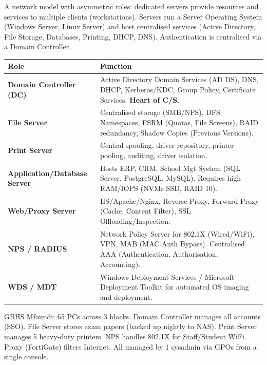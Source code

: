 \documentclass[11pt]{article}
\newcommand{\cle}[1]{{\popxbold\color{popdark}#1}}
\newcounter{popsec}
\newcounter{popsub}
\newcommand{\courssub}[1]{%
  \stepcounter{popsub}%
  \par\vspace{9pt}\noindent{\popxbold\fontsize{11.5}{13}\selectfont\color{popink}{\color{poporange}\thepopsec.\thepopsub}\hspace{6pt}#1}\par\nopagebreak\vspace{4pt}
}
\begin{document}
\courssub{Client/Server Architecture}

\begin{definition}
A network model with \cle{asymmetric roles}: dedicated \cle{servers} provide resources and services to multiple \cle{clients} (workstations). Servers run a \cle{Server Operating System} (Windows Server, Linux Server) and host centralised services (Active Directory, File Storage, Databases, Printing, DHCP, DNS). Authentication is centralised via a \cle{Domain Controller}.
\end{definition}

\begin{propriete}
\begin{center}
\begin{tabularx}{\linewidth}{|l|X|}
\hline
\rowcolor{popblueL}
\textbf{Role} & \textbf{Function} \\
\hline
\textbf{Domain Controller (DC)} & Active Directory Domain Services (AD DS), DNS, DHCP, Kerberos/KDC, Group Policy, Certificate Services. \textbf{Heart of C/S}. \\
\hline
\textbf{File Server} & Centralised storage (SMB/NFS), DFS Namespaces, FSRM (Quotas, File Screens), RAID redundancy, Shadow Copies (Previous Versions). \\
\hline
\textbf{Print Server} & Central spooling, driver repository, printer pooling, auditing, driver isolation. \\
\hline
\textbf{Application/Database Server} & Hosts ERP, CRM, School Mgt System (SQL Server, PostgreSQL, MySQL). Requires high RAM/IOPS (NVMe SSD, RAID 10). \\
\hline
\textbf{Web/Proxy Server} & IIS/Apache/Nginx, Reverse Proxy, Forward Proxy (Cache, Content Filter), SSL Offloading/Inspection. \\
\hline
\textbf{NPS / RADIUS} & Network Policy Server for 802.1X (Wired/WiFi), VPN, MAB (MAC Auth Bypass). Centralised AAA (Authentication, Authorisation, Accounting). \\
\hline
\textbf{WDS / MDT} & Windows Deployment Services / Microsoft Deployment Toolkit for automated OS imaging and deployment. \\
\hline
\end{tabularx}
\end{center}
\end{propriete}

\begin{exemplebox}
GBHS Mfoundi: 65 PCs across 3 blocks. Domain Controller manages all accounts (SSO). File Server stores exam papers (backed up nightly to NAS). Print Server manages 5 heavy-duty printers. NPS handles 802.1X for Staff/Student WiFi. Proxy (FortiGate) filters Internet. All managed by 1 sysadmin via GPOs from a single console.
\end{exemplebox}
\end{document}
